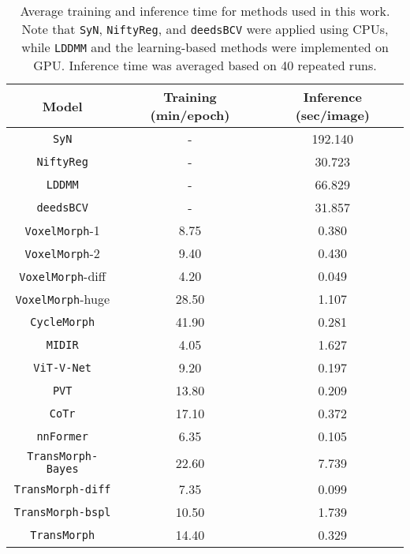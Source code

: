 \documentclass[times,twocolumn,final]{elsarticle}
\begin{document}
\begin{table}[!t]
\centering
\fontsize{8}{9.5}\selectfont
\begin{tabular}{ c || c | c}
 \hline
 Model & Training (min/epoch) & Inference (sec/image)\\
 \hline
 \hline
 \texttt{SyN} & - & 192.140\\
 \hline
 \texttt{NiftyReg} & - &30.723\\
 \hline
 \texttt{LDDMM} & - & 66.829\\
 \hline
 \texttt{deedsBCV} & - & 31.857\\
 \hline
 \texttt{VoxelMorph}-1 & 8.75 & 0.380\\
 \hline
 \texttt{VoxelMorph}-2 & 9.40 & 0.430\\
 \hline
 \texttt{VoxelMorph}-diff & 4.20 & 0.049\\
 \hline
 \texttt{VoxelMorph}-huge & 28.50 & 1.107\\
 \hline
 \texttt{CycleMorph} & 41.90 & 0.281\\
 \hline
 \texttt{MIDIR} & 4.05 & 1.627\\
 \hline
 \texttt{ViT-V-Net} & 9.20 & 0.197 \\
 \hline
 \texttt{PVT} & 13.80 & 0.209\\
 \hline
 \texttt{CoTr} & 17.10 & 0.372\\
  \hline
 \texttt{nnFormer} & 6.35 & 0.105\\
 \hline
 \hline
 \texttt{TransMorph-Bayes} & 22.60 & 7.739\\
 \hline
 \texttt{TransMorph-diff} & 7.35 & 0.099\\
 \hline
 \texttt{TransMorph-bspl} & 10.50 & 1.739\\
 \hline
 \texttt{TransMorph} & 14.40 & 0.329\\
 \hline
\end{tabular}
\caption{Average training and inference time for methods used in this work. Note that \texttt{SyN}, \texttt{NiftyReg}, and \texttt{deedsBCV} were applied using CPUs, while \texttt{LDDMM} and the learning-based methods were implemented on GPU. Inference time was averaged based on 40 repeated runs.}\label{tab:table_time}
\end{table}
\end{document}
